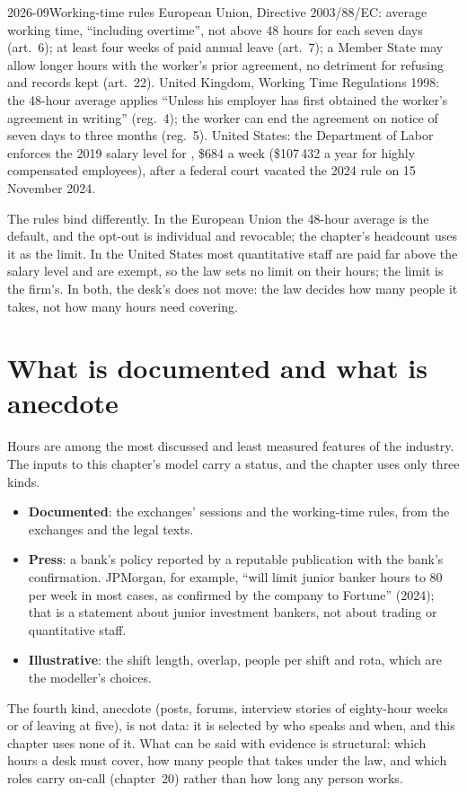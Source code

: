 \begin{dated}{2026-09}{Working-time rules}\label{dat:in:hours-rhythm-and-intensity:rules}
European Union, Directive 2003/88/EC: average working time, ``including overtime'', not above 48 hours for each seven
days (art.~6); at least four weeks of paid annual leave (art.~7); a Member State may allow longer hours with the worker's
prior agreement, no detriment for refusing and records kept (art.~22). United Kingdom, Working Time Regulations 1998:
the 48-hour average applies ``Unless his employer has first obtained the worker's agreement in writing'' (reg.~4); the
worker can end the agreement on notice of seven days to three months (reg.~5). United States: the Department of Labor
enforces the 2019 salary level for , \$684 a week (\$107\,432 a year for highly compensated employees),
after a federal court vacated the 2024 rule on 15 November 2024.
\end{dated}

The rules bind differently. In the European Union the 48-hour average is the default, and the opt-out is individual and
revocable; the chapter's headcount uses it as the limit. In the United States most quantitative staff are paid far above
the salary level and are exempt, so the law sets no limit on their hours; the limit is the firm's. In both, the desk's
 does not move: the law decides how many people it takes, not how many hours need covering.

\section{What is documented and what is anecdote}

Hours are among the most discussed and least measured features of the industry. The inputs to this chapter's model carry
a status, and the chapter uses only three kinds.
\begin{itemize}
\item \textbf{Documented}: the exchanges' sessions and the working-time rules, from the exchanges and the legal texts.
\item \textbf{Press}: a bank's policy reported by a reputable publication with the bank's confirmation. JPMorgan, for
example, ``will limit junior banker hours to 80 per week in most cases, as confirmed by the company to Fortune'' (2024);
that is a statement about junior investment bankers, not about trading or quantitative staff.
\item \textbf{Illustrative}: the shift length, overlap, people per shift and rota, which are the modeller's choices.
\end{itemize}
The fourth kind, anecdote (posts, forums, interview stories of eighty-hour weeks or of leaving at five), is not data:
it is selected by who speaks and when, and this chapter uses none of it. What can be said with evidence is structural:
which hours a desk must cover, how many people that takes under the law, and which roles carry on-call (chapter~20)
rather than how long any person works.

